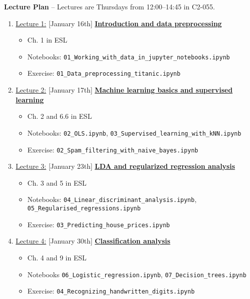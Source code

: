 \documentclass[12pt, a4paper]{article}
\begin{document}
\newpage
\noindent\textbf{\large Lecture Plan}
-- Lectures are Thursdays from 12:00--14:45 in C2-055. \\
\begin{enumerate}
  \item[] \underline{Lecture 1:} [January 16th] \underline{\bf Introduction and data preprocessing}
    {\small
      \begin{itemize}
        \item Ch. 1 in ESL
        \item Notebooks: \texttt{01\_Working\_with\_data\_in\_jupyter\_notebooks.ipynb}
        \item Exercise: \texttt{01\_Data\_preprocessing\_titanic.ipynb}
      \end{itemize}
    }
  \item[] \underline{Lecture 2:} [January 17th] \underline{\bf Machine learning basics and supervised learning}
    {\small
      \begin{itemize}
        \item Ch. 2 and 6.6 in ESL
        \item Notebooks: \texttt{02\_OLS.ipynb}, \texttt{03\_Supervised\_learning\_with\_kNN.ipynb}
        \item Exercise: \texttt{02\_Spam\_filtering\_with\_naive\_bayes.ipynb}
      \end{itemize}
    }
  \item[] \underline{Lecture 3:} [January 23th] \underline{\bf LDA and regularized regression analysis}
    {\small
      \begin{itemize}
        \item Ch. 3 and 5 in ESL
        \item Notebooks: \texttt{04\_Linear\_discriminant\_analysis.ipynb}, \texttt{05\_Regularised\_regressions.ipynb}
        \item Exercise: \texttt{03\_Predicting\_house\_prices.ipynb}
      \end{itemize}
    }
\item [] \underline{Lecture 4:} [January 30th] \underline{\bf Classification analysis}
        {\small
          \begin{itemize}
            \item Ch. 4 and 9 in ESL
            \item Notebooks \texttt{06\_Logistic\_regression.ipynb}, \texttt{07\_Decision\_trees.ipynb}
            \item Exercise: \texttt{04\_Recognizing\_handwritten\_digits.ipynb}

\end{itemize}}
\end{enumerate}
\end{document}
